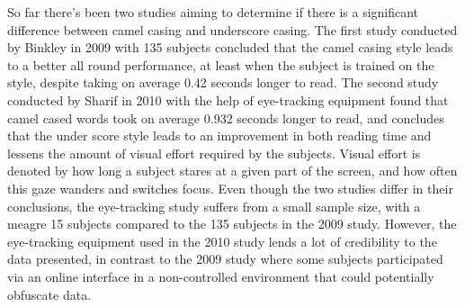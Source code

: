\iffalse
\begin{itemize}
  \item Have a specific background or spread it out
  \item May be necessary to introduce certain things
  \item From our running example, we might discuss prior work on simplifying parallel programming, or SOTA with e.g., threads
\end{itemize}
\fi


So far there's been two studies aiming to determine if there is a significant difference between camel casing and underscore casing. The first study conducted by Binkley \etal in 2009 \cite{to-camelCase-or-under-score} with 135 subjects concluded that the camel casing style leads to a better all round performance, at least when the subject is trained on the style, despite taking on average 0.42 seconds longer to read. The second study conducted by Sharif \etal in 2010 \cite{eye-tracking-study} with the help of eye-tracking equipment found that camel cased words took on average 0.932 seconds longer to read, and concludes that the under score style leads to an improvement in both reading time and lessens the amount of visual effort required by the subjects. Visual effort is denoted by how long a subject stares at a given part of the screen, and how often this gaze wanders and switches focus. Even though the two studies differ in their conclusions, the eye-tracking study suffers from a small sample size, with a meagre 15 subjects compared to the 135 subjects in the 2009 study. However, the eye-tracking equipment used in the 2010 study lends a lot of credibility to the data presented, in contrast to the 2009 study where some subjects participated via an online interface in a non-controlled environment that could potentially obfuscate data.
